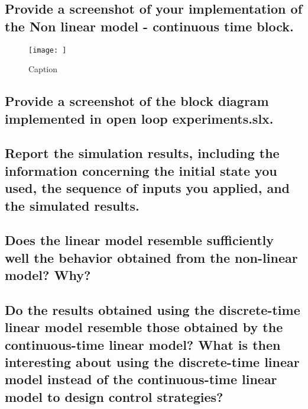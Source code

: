 \subsection{Provide a screenshot of your implementation of the Non linear model - continuous time block.}

\begin{figure}
    \centering
    \texttt{[image: ]}
    \caption{Caption}
    \label{fig:my_label}
\end{figure}




\subsection{Provide a screenshot of the block diagram implemented in open loop experiments.slx.}




\subsection{Report the simulation results, including the information concerning the initial state you used, the sequence of inputs you applied, and the simulated results.}




\subsection{Does the linear model resemble sufficiently well the behavior obtained from the non-linear model? Why?}




\subsection{Do the results obtained using the discrete-time linear model resemble those obtained by the continuous-time linear model? What is then interesting about using the discrete-time linear model instead of the continuous-time linear model to design control strategies?}



